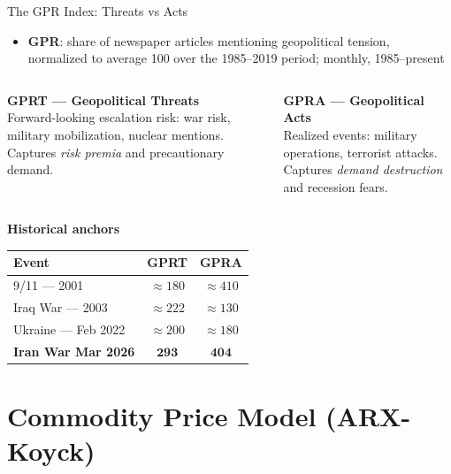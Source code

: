 ﻿\documentclass[aspectratio=1610]{beamer}
\begin{document}
\begin{frame}[shrink=10]{The GPR Index: Threats vs Acts \parencite{caldara_measuring_2022}}

\begin{itemize}
  \item \textbf{GPR}: share of newspaper articles mentioning geopolitical tension,
          normalized to average 100 over the 1985--2019 period; monthly, 1985--present
\end{itemize}

\smallskip

\begin{columns}[T]
\textbf{GPRT --- Geopolitical Threats}\\[6pt]
Forward-looking escalation risk: war risk, military mobilization,
nuclear mentions.\\[6pt]
Captures \emph{risk premia} and precautionary demand.

\textbf{GPRA --- Geopolitical Acts}\\[6pt]
Realized events: military operations, terrorist attacks.\\[6pt]
Captures \emph{demand destruction} and recession fears.
\end{columns}

\medskip

  \begin{center}
  \small
  \textbf{Historical anchors}\\
  \smallskip
  \begin{tabular}{@{}lcc@{}}
    \toprule
    Event                     & GPRT & GPRA \\
    \midrule
    9/11 --- 2001             & $\approx 180$ & $\approx 410$ \\
    Iraq War --- 2003         & $\approx 222$ & $\approx 130$ \\
    Ukraine --- Feb 2022      & $\approx 200$ & $\approx 180$ \\
    \textbf{Iran War Mar 2026}& $\mathbf{293}$ & $\mathbf{404}$ \\
    \bottomrule
  \end{tabular}
  \end{center}
\end{frame}
\section{Commodity Price Model (ARX-Koyck)}
\end{document}
